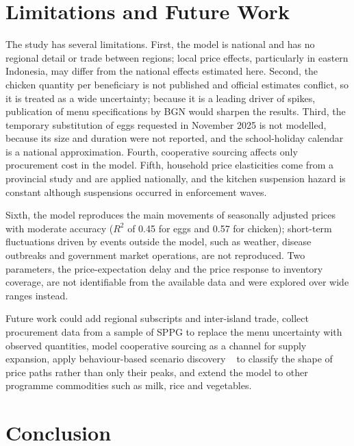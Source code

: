\documentclass[10pt,twocolumn,a4paper]{article}
\begin{document}
\section{Limitations and Future Work}\label{sec:limits}

The study has several limitations. First, the model is national and has no regional detail or trade between regions; local price effects, particularly in eastern Indonesia, may differ from the national effects estimated here. Second, the chicken quantity per beneficiary is not published and official estimates conflict, so it is treated as a wide uncertainty; because it is a leading driver of spikes, publication of menu specifications by BGN would sharpen the results. Third, the temporary substitution of eggs requested in November 2025 is not modelled, because its size and duration were not reported, and the school-holiday calendar is a national approximation. Fourth, cooperative sourcing affects only procurement cost in the model. Fifth, household price elasticities come from a provincial study and are applied nationally, and the kitchen suspension hazard is constant although suspensions occurred in enforcement waves.


Sixth, the model reproduces the main movements of seasonally adjusted prices with moderate accuracy ($R^2$ of 0.45 for eggs and 0.57 for chicken); short-term fluctuations driven by events outside the model, such as weather, disease outbreaks and government market operations, are not reproduced. Two parameters, the price-expectation delay and the price response to inventory coverage, are not identifiable from the available data and were explored over wide ranges instead.


Future work could add regional subscripts and inter-island trade, collect procurement data from a sample of SPPG to replace the menu uncertainty with observed quantities, model cooperative sourcing as a channel for supply expansion, apply behaviour-based scenario discovery ~\cite{steinmann2020} to classify the shape of price paths rather than only their peaks, and extend the model to other programme commodities such as milk, rice and vegetables.


\section{Conclusion}\label{sec:conclusion}
\end{document}
